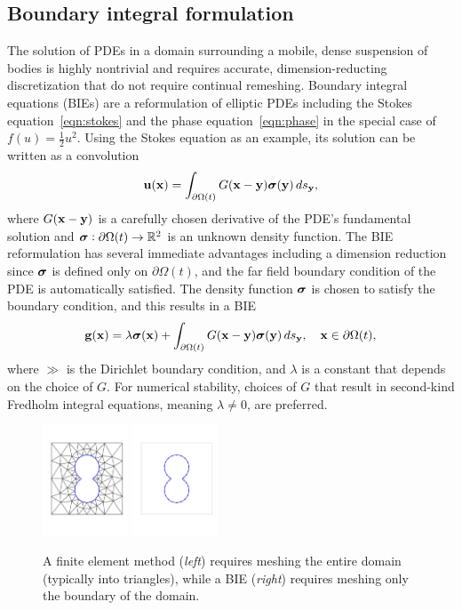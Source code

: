 \subsection{Boundary integral formulation}
\label{sec:bie}
The solution of PDEs in a domain surrounding a mobile, dense suspension
of bodies is highly nontrivial and requires accurate,
dimension-reducting discretization
that do not require continual remeshing.  
Boundary integral equations (BIEs) are a reformulation of elliptic PDEs
including the Stokes equation~\eqref{eqn:stokes} and the phase
equation~\eqref{eqn:phase} in the special case of $f(u) =
\tfrac{1}{2}u^2$. Using the Stokes equation as an example, its solution
can be written as a convolution 
\begin{align*}
  \mathbf{u}(\mathbf{x}) = \int_{\partial\Omega(t)} G(\mathbf{x} - \mathbf{y}) \boldsymbol{\sigma}(\mathbf{y}) \, ds_{\mathbf{y}},
\end{align*}
where $G(\mathbf{x} - \mathbf{y})$ is a carefully chosen derivative of the PDE's
fundamental solution and $\boldsymbol{\sigma}: \partial \Omega(t) \rightarrow \mathbb{R}^2$
is an unknown density function. The BIE reformulation has several
immediate advantages including a dimension reduction since $\boldsymbol{\sigma}$ is
defined only on $\partial \Omega(t)$, and the far field boundary
condition of the PDE is automatically satisfied. The density
function $\boldsymbol{\sigma}$ is chosen to satisfy the boundary condition, and this
results in a BIE 
\begin{align*}
  \mathbf{g}(\mathbf{x}) = \lambda \boldsymbol{\sigma}(\mathbf{x}) + 
    \int_{\partial\Omega(t)} G(\mathbf{x} - \mathbf{y}) \boldsymbol{\sigma}(\mathbf{y}) \, ds_{\mathbf{y}},
    \quad \mathbf{x} \in \partial\Omega(t),
\end{align*}
where $\gg$ is the Dirichlet boundary condition, and $\lambda$ is a
constant that depends on the choice of $G$. For numerical stability,
choices of $G$ that result in second-kind Fredholm integral equations,
meaning $\lambda \neq 0$, are preferred.

\begin{figure}
  \centering
  \includegraphics[width=1in]{figures/Background/Peanut/PeanutFEM.pdf}
  \includegraphics[width=1in]{figures/Background/Peanut/PeanutIE.pdf}
  \caption{\label{fig:fem_vs_bie} \footnotesize A finite element method
  ({\em left}) requires meshing the entire domain (typically into
  triangles), while a BIE ({\em right}) requires meshing only the
  boundary of the domain.}
\end{figure}

